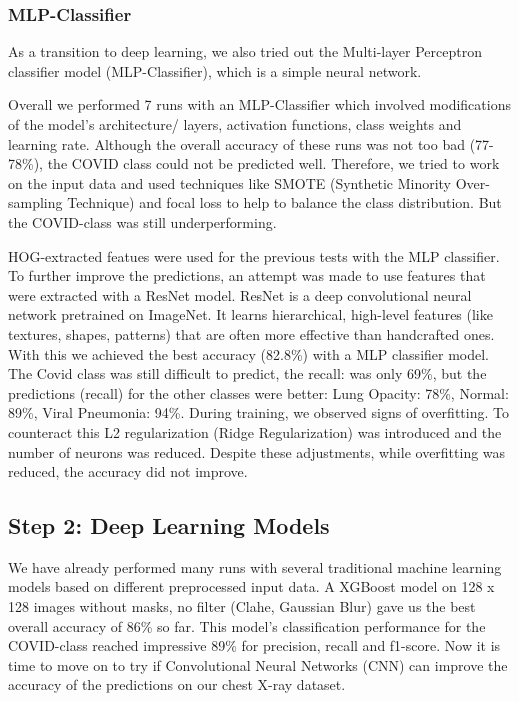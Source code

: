 \documentclass{article}
\begin{document}

\subsubsection {MLP-Classifier} 
As a transition to deep learning, we also tried out the Multi-layer Perceptron classifier model (MLP-Classifier), which is a simple neural network. 

Overall we performed 7 runs with an MLP-Classifier which involved modifications of the model's architecture/ layers, activation functions, class weights and learning rate. Although the overall accuracy of these runs was not too bad (77-78\%), the COVID class could not be predicted well. Therefore, we tried to work on the input data and used techniques like SMOTE (Synthetic Minority Over-sampling Technique) and focal loss to help to balance the class distribution. But the COVID-class was still underperforming. 

HOG-extracted featues were used for the previous tests with the MLP classifier. To further improve the predictions, an attempt was made to use features that were extracted with a ResNet model. ResNet is a deep convolutional neural network pretrained on ImageNet. It learns hierarchical, high-level features (like textures, shapes, patterns) that are often more effective than handcrafted ones. With this we achieved the best accuracy (82.8\%) with a MLP classifier model. The Covid class was still difficult to predict, the recall: was only 69\%, but the predictions (recall) for the other classes were better: Lung Opacity: 78\%, Normal: 89\%, Viral Pneumonia: 94\%.
During training, we observed signs of overfitting. To counteract this L2 regularization (Ridge Regularization) was introduced and the number of neurons was reduced. Despite these adjustments, while overfitting was reduced, the accuracy did not improve.


\subsection{Step 2: Deep Learning Models}

We have already performed many runs with several traditional machine learning models based on different preprocessed input data. A XGBoost model on 128 x 128 images without masks, no filter (Clahe, Gaussian Blur) gave us the best overall accuracy of 86\% so far. This model's classification performance for the COVID-class reached impressive 89\% for precision, recall and f1-score. Now it is time to move on to try if Convolutional Neural Networks (CNN) can improve the accuracy of the predictions on our chest X-ray dataset. 
\end{document}

